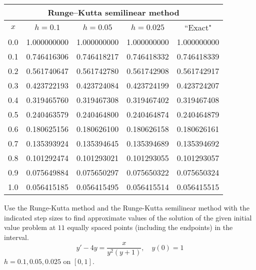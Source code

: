 \documentclass{ximera}
\begin{document}
\begin{problem}
\begin{solution}
{\small
\begin{tabular}{|c|r|r|r|r|}
\hline
\multicolumn{5}{|c|}{
 Runge--Kutta  semilinear method}\\\hline
\multicolumn{1}{|c|}{$x$}&
\multicolumn{1}{|c|}{$h=0.1$}&
\multicolumn{1}{|c|}{$h=0.05$}&
\multicolumn{1}{|c|}{$h=0.025$}&
\multicolumn{1}{|c|}{``Exact"}\\ \hline
0.0 & 1.000000000 & 1.000000000 & 1.000000000 & 1.000000000 \\
0.1 & 0.746416306 & 0.746418217 & 0.746418332 & 0.746418339 \\
0.2 & 0.561740647 & 0.561742780 & 0.561742908 & 0.561742917 \\
0.3 & 0.423722193 & 0.423724084 & 0.423724199 & 0.423724207 \\
0.4 & 0.319465760 & 0.319467308 & 0.319467402 & 0.319467408 \\
0.5 & 0.240463579 & 0.240464800 & 0.240464874 & 0.240464879 \\
0.6 & 0.180625156 & 0.180626100 & 0.180626158 & 0.180626161 \\
0.7 & 0.135393924 & 0.135394645 & 0.135394689 & 0.135394692 \\
0.8 & 0.101292474 & 0.101293021 & 0.101293055 & 0.101293057 \\
0.9 & 0.075649884 & 0.075650297 & 0.075650322 & 0.075650324 \\
1.0 & 0.056415185 & 0.056415495 & 0.056415514 & 0.056415515 \\
\hline
\end{tabular}}
\end{solution}
\end{problem}

\begin{problem}\label{exer:3.3.21} Use the Runge-Kutta method and the Runge-Kutta semilinear method with the indicated step sizes to find approximate values of the solution of the given initial value problem at $11$ equally spaced points (including the endpoints) in the interval.
$$y'-4y=\frac{x}{y^2(y+1)},\quad y(0)=1$$
 $h=0.1,0.05,0.025$ on $[0,1]$.
 \end{problem}
\end{document}
